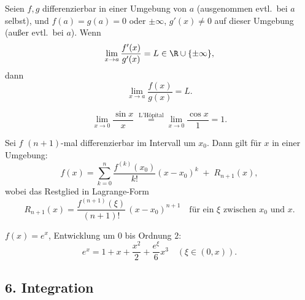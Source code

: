 \begin{theorem}
  Seien $f,g$ differenzierbar in einer Umgebung von $a$ (ausgenommen evtl.\ bei $a$ selbst), und $f(a)=g(a)=0$ oder $\pm\infty$, $g'(x)\ne0$ auf dieser Umgebung (außer evtl.\ bei $a$). Wenn
  \[
    \lim_{x\to a} \frac{f'(x)}{g'(x)} = L \in \R \cup \{\pm\infty\},
  \]
  dann
  \[
    \lim_{x\to a} \frac{f(x)}{g(x)} = L.
  \]
\end{theorem}
\begin{example}
  \[
    \lim_{x\to0} \frac{\sin x}{x} 
    \;\stackrel{\text{L'Hôpital}}= 
    \lim_{x\to0} \frac{\cos x}{1} = 1.
  \]
\end{example}

\begin{theorem}[Taylor, 1-D]
  Sei $f$ $(n+1)$-mal differenzierbar im Intervall um $x_0$. Dann gilt für $x$ in einer Umgebung:
  \[
    f(x) = \sum_{k=0}^n \frac{f^{(k)}(x_0)}{k!}(x - x_0)^k 
    \;+\; R_{n+1}(x),
  \]
  wobei das Restglied in Lagrange-Form
  \[
    R_{n+1}(x) = \frac{f^{(n+1)}(\xi)}{(n+1)!}\,(x - x_0)^{n+1}
    \quad\text{für ein }\xi\text{ zwischen }x_0\text{ und }x.
  \]
\end{theorem}
\begin{example}
  $f(x) = e^x$, Entwicklung um $0$ bis Ordnung $2$:
  \[
    e^x = 1 + x + \frac{x^2}{2} + \frac{e^\xi}{6} x^3 \quad(\xi\in(0,x)).
  \]
\end{example}

\subsection{6. Integration}